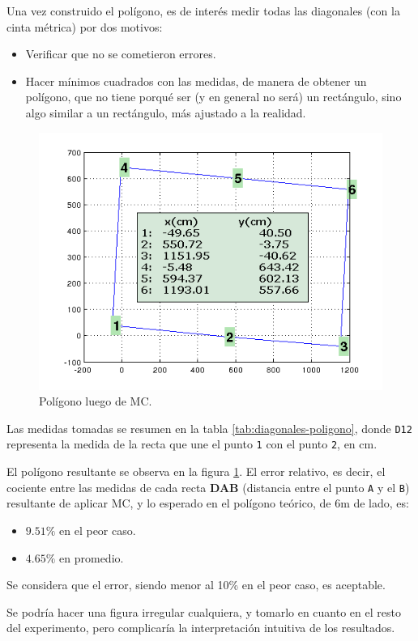 \documentclass[main]{subfiles}
\begin{document}
Una vez construido el polígono, es de interés medir todas las diagonales (con la cinta métrica) por dos motivos:
\begin{itemize}
\item Verificar que no se cometieron errores.
\item Hacer mínimos cuadrados con las medidas, de manera de obtener un polígono, que no tiene porqué ser (y en general no será) un rectángulo, sino algo similar a un rectángulo, más ajustado a la realidad.
\end{itemize}

\begin{figure}
\vspace{-20pt}
  \includegraphics[width=.5\textwidth]{./pics_gps/pol_mc.png}
\caption{Polígono luego de MC.}
\label{fig:pol_mc.png}
\vspace{-20pt}
\end{figure}
Las medidas tomadas se resumen en la tabla \ref{tab:diagonales-poligono}, donde \verb+D12+ representa la medida de la recta que une el punto \verb+1+ con el punto \verb+2+, en cm.

El polígono resultante se observa en la figura \ref{fig:pol_mc.png}. El error relativo, es decir, el cociente entre las medidas de cada recta \textbf{DAB} (distancia entre el punto \verb+A+ y el \verb+B+) resultante de aplicar MC, y lo esperado en el polígono teórico, de 6m de lado, es:

\begin{itemize}
\item $9.51\%$ en el peor caso.
\item $4.65\%$ en promedio.
\end{itemize}

Se considera que el error, siendo  menor al 10\% en el peor caso, es aceptable.

Se podría hacer una figura irregular cualquiera, y tomarlo en cuanto en el resto del experimento, pero complicaría la interpretación intuitiva de los resultados.
\end{document}
